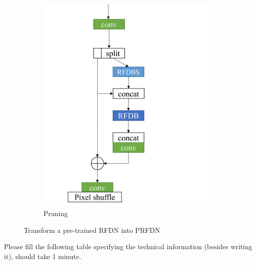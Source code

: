 \documentclass{article}
\begin{document}
\begin{figure}
\begin{subfigure}[b]{0.49\linewidth}
        \includegraphics[width=\textwidth]{../Pruning.pdf}
        \caption{Pruning}
        \label{fig:Pruning}
    \end{subfigure}
    \caption{Transform a pre-trained RFDN into PRFDN}
    \label{fig:PRFDN}
\end{figure}

\vspace{4mm}
Please fill the following table specifying the technical information (besides writing it), should take 1 minute. 

\begin{table}[]
    \centering
    \caption{FILL THIS TABLE PLEASE}
    \label{tab:my_label}
\end{table}
\end{document}
